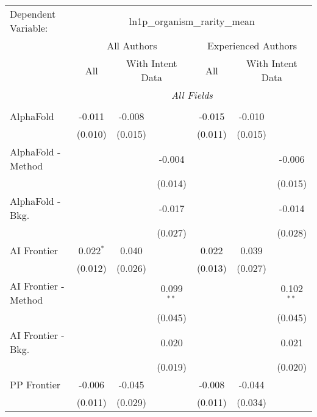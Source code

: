 \begingroup
\centering
\begin{tabular}{lcccccc}
   \tabularnewline \midrule \midrule
   Dependent Variable: & \multicolumn{6}{c}{ln1p\_organism\_rarity\_mean}\\
 & \multicolumn{3}{c}{All Authors} & \multicolumn{3}{c}{Experienced Authors} \\
\cmidrule(lr){2-4} \cmidrule(lr){5-7}
 & \multicolumn{1}{c}{All} & \multicolumn{2}{c}{With Intent Data} & \multicolumn{1}{c}{All} & \multicolumn{2}{c}{With Intent Data} \\
\cmidrule(lr){2-2} \cmidrule(lr){3-4} \cmidrule(lr){5-5} \cmidrule(lr){6-7}
 & \multicolumn{6}{c}{\textit{All Fields}} \\ \\
   AlphaFold            & -0.011      & -0.008  &               & -0.015  & -0.010  &   \\   
                        & (0.010)     & (0.015) &               & (0.011) & (0.015) &   \\   
   AlphaFold - Method   &             &         & -0.004        &         &         & -0.006\\   
                        &             &         & (0.014)       &         &         & (0.015)\\   
   AlphaFold - Bkg.     &             &         & -0.017        &         &         & -0.014\\   
                        &             &         & (0.027)       &         &         & (0.028)\\   
   AI Frontier          & 0.022$^{*}$ & 0.040   &               & 0.022   & 0.039   &   \\   
                        & (0.012)     & (0.026) &               & (0.013) & (0.027) &   \\   
   AI Frontier - Method &             &         & 0.099$^{**}$  &         &         & 0.102$^{**}$\\   
                        &             &         & (0.045)       &         &         & (0.045)\\   
   AI Frontier - Bkg.   &             &         & 0.020         &         &         & 0.021\\   
                        &             &         & (0.019)       &         &         & (0.020)\\   
   PP Frontier          & -0.006      & -0.045  &               & -0.008  & -0.044  &   \\   
                        & (0.011)     & (0.029) &               & (0.011) & (0.034) &   \\   

\end{tabular}
